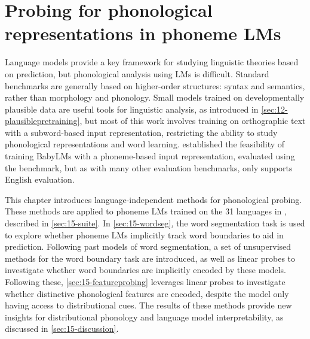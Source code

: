 \chapter{Probing for phonological representations in phoneme LMs}\label{chapter:phonology}


Language models provide a key framework for studying linguistic theories based on prediction, but phonological analysis using LMs is difficult. Standard benchmarks are generally based on higher-order structures: syntax and semantics, rather than morphology and phonology. Small models trained on developmentally plausible data are useful tools for linguistic analysis, as introduced in \cref{sec:12-plausiblepretraining}, but most of this work involves training on orthographic text with a subword-based input representation, restricting the ability to study phonological representations and word learning.  established the feasibility of training BabyLMs with a phoneme-based input representation, evaluated using the \babyslm benchmark, but as with many other evaluation benchmarks, \babyslm only supports English evaluation.

This chapter introduces language-independent methods for phonological probing. These methods are applied to phoneme LMs trained on the 31 languages in \ipachildes, described in \cref{sec:15-suite}. In \cref{sec:15-wordseg}, the word segmentation task is used to explore whether phoneme LMs implicitly track word boundaries to aid in prediction. Following past models of word segmentation, a set of unsupervised methods for the word boundary task are introduced, as well as linear probes to investigate whether word boundaries are implicitly encoded by these models. Following these, \cref{sec:15-featureprobing} leverages linear probes to investigate whether distinctive phonological features are encoded, despite the model only having access to distributional cues. The results of these methods provide new insights for distributional phonology and language model interpretability, as discussed in \cref{sec:15-discussion}.



